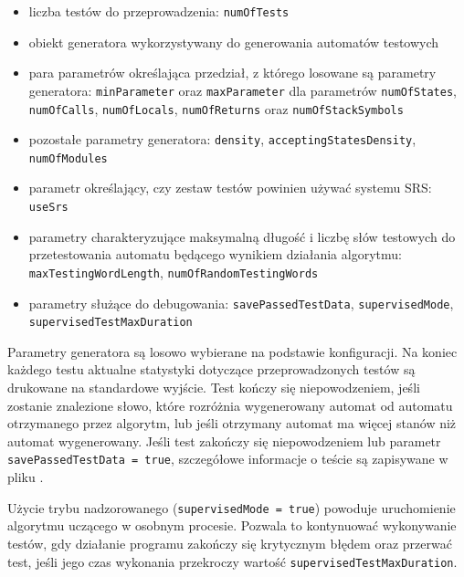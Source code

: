 \begin{itemize}
    \item liczba testów do przeprowadzenia: \texttt{numOfTests}
    
    \item obiekt generatora wykorzystywany do generowania automatów testowych
    
    \item para parametrów określająca przedział, z którego losowane są parametry generatora:
    \texttt{minParameter} oraz \texttt{maxParameter} dla parametrów \texttt{numOfStates}, \texttt{numOfCalls}, \texttt{numOfLocals},
    \texttt{numOfReturns} oraz \texttt{numOfStackSymbols}
    
    \item pozostałe parametry generatora: \texttt{density}, \texttt{acceptingStatesDensity}, \texttt{numOf\-Modules}

    \item parametr określający, czy zestaw testów powinien używać systemu SRS: \texttt{useSrs}

    \item parametry charakteryzujące maksymalną długość i liczbę słów testowych do przetestowania automatu będącego
    wynikiem działania algorytmu: \texttt{maxTest\-ingWordLength}, \texttt{numOfRandomTestingWords}

    \item parametry służące do debugowania: \texttt{savePassedTestData}, \texttt{supervisedMode}, \texttt{supervisedTestMaxDuration}
\end{itemize}

Parametry generatora są losowo wybierane na podstawie konfiguracji. Na koniec każdego testu aktualne statystyki dotyczące przeprowadzonych
testów są drukowane na standardowe wyjście. Test kończy się niepowodzeniem, jeśli zostanie znalezione słowo, które rozróżnia wygenerowany
automat od automatu otrzymanego przez algorytm, lub jeśli otrzymany automat ma więcej stanów niż automat wygenerowany.
Jeśli test zakończy się niepowodzeniem lub parametr \texttt{savePassedTestData = true}, szczegółowe informacje o teście
są zapisywane w pliku .

Użycie trybu nadzorowanego (\texttt{supervisedMode = true}) powoduje uruchomienie algorytmu uczącego w osobnym procesie.
Pozwala to kontynuować wykonywanie testów, gdy działanie programu zakończy się krytycznym błędem oraz przerwać test,
jeśli jego czas wykonania przekroczy wartość \texttt{supervisedTestMaxDuration}.

